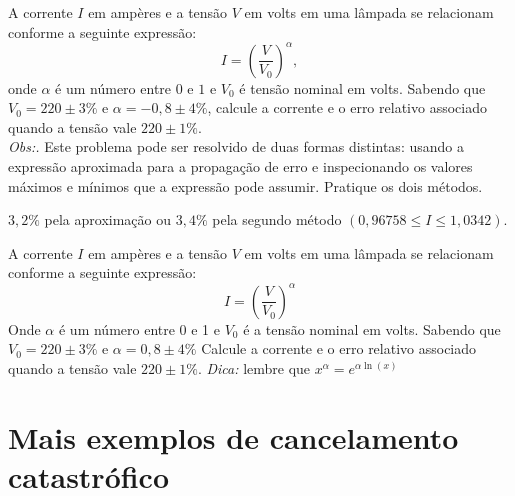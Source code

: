 \begin{exer} A corrente $I$ em ampères e a tensão $V$ em volts em uma lâmpada se relacionam conforme a seguinte expressão:
  \begin{equation*}
    I=\left(\frac{V}{V_0}\right)^\alpha,
  \end{equation*}
onde $\alpha$ é um número entre $0$ e $1$ e $V_0$ é tensão nominal em volts. Sabendo que $V_0=220\pm 3\%$ e $\alpha=-0,8\pm 4\%$, calcule a corrente e o erro relativo associado quando a tensão vale $220\pm 1\%$.\\
\emph{Obs:.} Este problema pode ser resolvido de duas formas distintas: usando a expressão aproximada para a propagação de erro e inspecionando os valores máximos e mínimos que a expressão pode assumir. Pratique os dois métodos.
\end{exer}
\begin{resp}
  
    $3,2\%$ pela aproximação ou $3,4\%$ pela segundo método  $\left(0,96758 \leq I\leq 1,0342\right)$.
   
\end{resp}

\begin{exer} A corrente $I$ em ampères e a tensão $V$ em volts em uma lâmpada se relacionam conforme a seguinte expressão:
$$I=\left(\frac{V}{V_0}\right)^\alpha$$
Onde $\alpha$ é um número entre 0 e 1 e $V_0$ é a tensão nominal em volts. Sabendo que $V_0=220\pm 3\%$ e $\alpha=0,8\pm 4\%$
Calcule a corrente e o erro relativo associado quando a tensão vale $220\pm 1\%$.
\emph{Dica:} lembre que $x^\alpha=e^{\alpha \ln(x)}$
\end{exer}

\section{Mais exemplos de cancelamento catastrófico}

